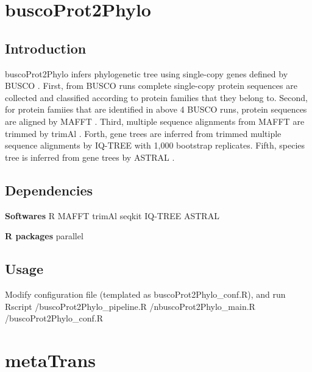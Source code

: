 \documentclass[11pt]{article}
\begin{document}
\begin{sloppypar}
\section{buscoProt2Phylo}
\subsection{Introduction}
buscoProt2Phylo infers phylogenetic tree using single-copy genes defined by BUSCO \parencite{simao2015busco}. 
First, from BUSCO runs complete single-copy protein sequences are collected and classified according to protein families that they belong to. 
Second, for protein famiies that are identified in above 4 BUSCO runs, protein sequences are aligned by MAFFT \parencite{katoh2002mafft}. 
Third, multiple sequence alignments from MAFFT are trimmed by trimAl \parencite{capella2009trimal}. 
Forth, gene trees are inferred from trimmed multiple sequence alignments by IQ-TREE \parencite{minh2020iq} with 1,000 bootstrap replicates. 
Fifth, species tree is inferred from gene trees by ASTRAL \parencite{zhang2018astral}.
\subsection{Dependencies}
\textbf{Softwares} \newline
R \newline
MAFFT \newline
trimAl \newline
seqkit \newline
IQ-TREE \newline
ASTRAL \newline
\par
\textbf{R packages} \newline
parallel \newline
\par
\subsection{Usage}
Modify configuration file (templated as buscoProt2Phylo\_conf.R), and run \newline
Rscript /buscoProt2Phylo\_pipeline.R /nbuscoProt2Phylo\_main.R /buscoProt2Phylo\_conf.R

\section{metaTrans}

\end{sloppypar}
\end{document}
